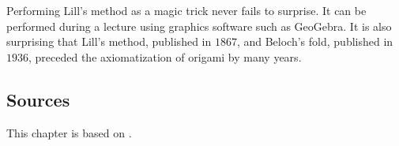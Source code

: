 Performing Lill's method as a magic trick never fails to surprise. It can be performed during a lecture using graphics software such as GeoGebra. It is also surprising that Lill's method, published in $1867$, and Beloch's fold, published in $1936$, preceded the  axiomatization of origami by many years.


\subsection*{Sources}

This chapter is based on \cite{bradford, hull-beloch, riaz}.
